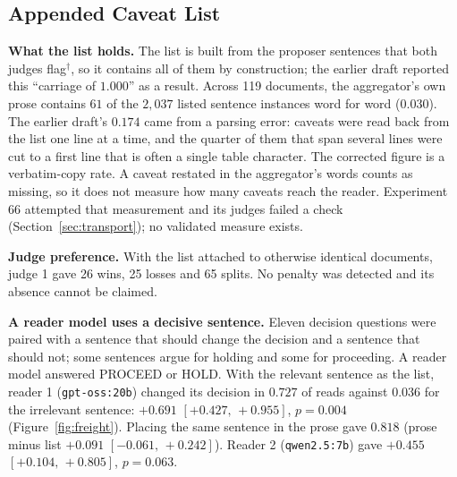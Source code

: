 \documentclass[10pt,twocolumn]{article}
\newcommand{\ci}[2]{\ensuremath{[#1,\,#2]}}
\begin{document}
\subsection{Appended Caveat List}
\label{sec:res-channel}

\textbf{What the list holds.} The list is built from the proposer
sentences that both judges flag$^\dagger$, so it contains all of them by
construction; the earlier draft reported this ``carriage of $1.000$''
as a result. Across 119 documents, the aggregator's own prose contains $61$ of
the $2{,}037$ listed sentence instances word for word ($0.030$). The earlier draft's $0.174$
came from a parsing error: caveats were read back from the list one
line at a time, and the quarter of them that span several lines were
cut to a first line that is often a single table character. The
corrected figure is a verbatim-copy rate. A caveat restated in the
aggregator's words counts as missing, so it does not measure how many
caveats reach the reader. Experiment 66 attempted that measurement and
its judges failed a check (Section~\ref{sec:transport}); no validated
measure exists.

\textbf{Judge preference.} With the list attached to otherwise
identical documents, judge 1 gave 26 wins, 25 losses and 65 splits. No
penalty was detected and its absence cannot be claimed.

\textbf{A reader model uses a decisive sentence.} Eleven decision
questions were paired with a sentence that should change the decision
and a sentence that should not; some sentences argue for holding and
some for proceeding. A reader model answered PROCEED or HOLD. With the
relevant sentence as the list, reader 1 (\texttt{gpt-oss:20b}) changed
its decision in $0.727$ of reads against $0.036$ for the irrelevant
sentence: $+0.691$ \ci{+0.427}{+0.955}, $p=0.004$
(Figure~\ref{fig:freight}). Placing the same sentence in the prose gave
$0.818$ (prose minus list $+0.091$ \ci{-0.061}{+0.242}). Reader 2
(\texttt{qwen2.5:7b}) gave $+0.455$ \ci{+0.104}{+0.805}, $p=0.063$.
\end{document}
